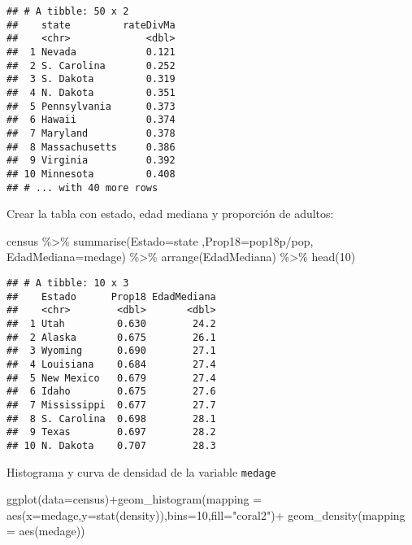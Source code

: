 \documentclass[
]{article}
\newenvironment{Shaded}{\begin{snugshade}}{\end{snugshade}}
\newcommand{\AttributeTok}[1]{\textcolor[rgb]{0.77,0.63,0.00}{#1}}
\newcommand{\DecValTok}[1]{\textcolor[rgb]{0.00,0.00,0.81}{#1}}
\newcommand{\FunctionTok}[1]{\textcolor[rgb]{0.00,0.00,0.00}{#1}}
\newcommand{\NormalTok}[1]{#1}
\newcommand{\SpecialCharTok}[1]{\textcolor[rgb]{0.00,0.00,0.00}{#1}}
\newcommand{\StringTok}[1]{\textcolor[rgb]{0.31,0.60,0.02}{#1}}
\begin{document}
\begin{verbatim}
## # A tibble: 50 x 2
##    state         rateDivMa
##    <chr>             <dbl>
##  1 Nevada            0.121
##  2 S. Carolina       0.252
##  3 S. Dakota         0.319
##  4 N. Dakota         0.351
##  5 Pennsylvania      0.373
##  6 Hawaii            0.374
##  7 Maryland          0.378
##  8 Massachusetts     0.386
##  9 Virginia          0.392
## 10 Minnesota         0.408
## # ... with 40 more rows
\end{verbatim}

Crear la tabla con estado, edad mediana y proporción de adultos:

\begin{Shaded}
\begin{Highlighting}[]
\NormalTok{census }\SpecialCharTok{\%\textgreater{}\%}
  \FunctionTok{summarise}\NormalTok{(}\AttributeTok{Estado=}\NormalTok{state ,}\AttributeTok{Prop18=}\NormalTok{pop18p}\SpecialCharTok{/}\NormalTok{pop, }\AttributeTok{EdadMediana=}\NormalTok{medage) }\SpecialCharTok{\%\textgreater{}\%}
  \FunctionTok{arrange}\NormalTok{(EdadMediana) }\SpecialCharTok{\%\textgreater{}\%} \FunctionTok{head}\NormalTok{(}\DecValTok{10}\NormalTok{)}
\end{Highlighting}
\end{Shaded}

\begin{verbatim}
## # A tibble: 10 x 3
##    Estado      Prop18 EdadMediana
##    <chr>        <dbl>       <dbl>
##  1 Utah         0.630        24.2
##  2 Alaska       0.675        26.1
##  3 Wyoming      0.690        27.1
##  4 Louisiana    0.684        27.4
##  5 New Mexico   0.679        27.4
##  6 Idaho        0.675        27.6
##  7 Mississippi  0.677        27.7
##  8 S. Carolina  0.698        28.1
##  9 Texas        0.697        28.2
## 10 N. Dakota    0.707        28.3
\end{verbatim}

Histograma y curva de densidad de la variable \texttt{medage}

\begin{Shaded}
\begin{Highlighting}[]
\FunctionTok{ggplot}\NormalTok{(}\AttributeTok{data=}\NormalTok{census)}\SpecialCharTok{+}\FunctionTok{geom\_histogram}\NormalTok{(}\AttributeTok{mapping =} \FunctionTok{aes}\NormalTok{(}\AttributeTok{x=}\NormalTok{medage,}\AttributeTok{y=}\FunctionTok{stat}\NormalTok{(density)),}\AttributeTok{bins=}\DecValTok{10}\NormalTok{,}\AttributeTok{fill=}\StringTok{"coral2"}\NormalTok{)}\SpecialCharTok{+}
\FunctionTok{geom\_density}\NormalTok{(}\AttributeTok{mapping =} \FunctionTok{aes}\NormalTok{(medage))}
\end{Highlighting}
\end{Shaded}
\end{document}
